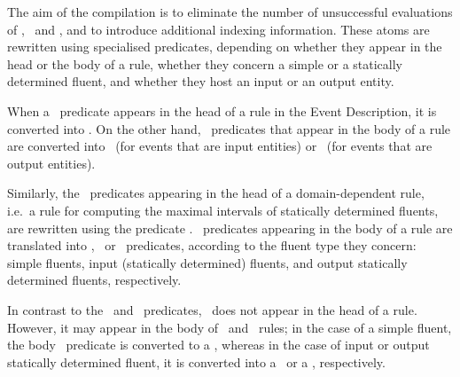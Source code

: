 The aim of the compilation is to eliminate the number of unsuccessful evaluations of \happensAt, \holdsFor\ and \holdsAt, and to introduce additional indexing information.
These atoms are rewritten using specialised predicates, depending on whether they appear in the head or the body of a rule, whether they concern a simple or a statically determined fluent, and whether they host an input or an output entity.

When a \happensAt\ predicate appears in the head of a rule in the Event Description, it is converted into \happensAtEv. On the other hand, \happensAt\ predicates that appear in the body of a rule are converted into \happensAtIE\ (for events that are input entities) or \happensAtProcessed\ (for events that are output entities).

Similarly, the \holdsFor\ predicates appearing in the head of a domain-dependent rule, i.e.~a rule for computing the maximal intervals of statically determined fluents, are rewritten using the predicate \holdsForSDFluent. \holdsFor\ predicates appearing in the body of a rule are translated into \holdsForProcessedSimpleFluent, \holdsForProcessedIE\ or \holdsForProcessedSDFluent\ predicates, according to the fluent type they concern: simple fluents, input (statically determined) fluents, and output statically determined fluents, respectively.

In contrast to the \happensAt\ and \holdsFor\ predicates, \holdsAt\ does not appear in the head of a rule. However, it may appear in the body of \initiatedAt\ and \terminatedAt\ rules; in the case of a simple fluent, the body \holdsAt\ predicate is converted to a \holdsAtProcessedSimpleFluent, whereas in the case of input or output statically determined fluent, it is converted into a \holdsAtProcessedIE\ or a \holdsAtProcessedSDFluent, respectively.

